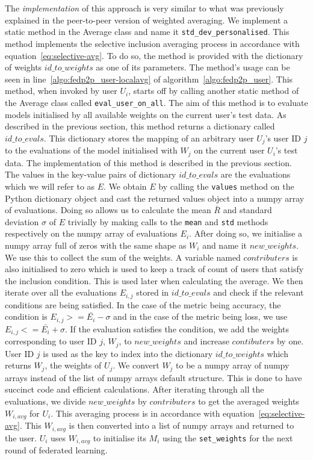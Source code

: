 \documentclass[12pt]{article}
\begin{document}
\\\\
The \textit{implementation} of this approach is very similar to what was previously explained in the peer-to-peer version of weighted averaging. We implement a static method in the Average class and name it \texttt{std\_dev\_personalised}. This method implements the selective inclusion averaging process in accordance with equation~\ref{eq:selective-avg}. To do so, the method is provided with the dictionary of weights $id\_to\_weights$ as one of its parameters. The method's usage can be seen in line~\ref{algo:fedp2p_user-localavg} of algorithm~\ref{algo:fedp2p_user}. This method, when invoked by user $U_i$, starts off by calling another static method of the Average class called \texttt{eval\_user\_on\_all}. The aim of this method is to evaluate models initialised by all available weights on the current user's test data. As described in the previous section, this method returns a dictionary called $id\_to\_evals$. This dictionary stores the mapping of an arbitrary user $U_j$'s user ID $j$ to the evaluations of the model initialised with $W_j$ on the current user $U_i$'s test data. The implementation of this method is described in the previous section. The values in the key-value pairs of dictionary $id\_to\_evals$ are the evaluations which we will refer to as $E$. We obtain $E$ by calling the \texttt{values} method on the Python dictionary object and cast the returned values object into a numpy array of evaluations. Doing so allows us to calculate the mean $\bar{R}$ and standard deviation $\sigma$ of $E$ trivially by making calls to the \texttt{mean} and \texttt{std} methods respectively on the numpy array of evaluations $E_i$. After doing so, we initialise a numpy array full of zeros with the same shape as $W_i$ and name it $new\_weights$. We use this to collect the sum of the weights. A variable named $contributers$ is also initialised to zero which is used to keep a track of count of users that satisfy the inclusion condition. This is used later when calculating the average. We then iterate over all the evaluations $E_{i,j}$ stored in $id\_to\_evals$ and check if the relevant conditions are being satisfied. In the case of the metric being accuracy, the condition is $E_{i,j} >= \bar{E_i}-\sigma$ and in the case of the metric being loss, we use $E_{i,j} <= \bar{E_i}+\sigma$. If the evaluation satisfies the condition, we add the weights corresponding to user ID $j$, $W_j$, to $new\_weights$ and increase $contibuters$ by one. User ID $j$ is used as the key to index into the dictionary $id\_to\_weights$ which returns $W_j$, the weights of $U_j$. We convert $W_j$ to be a numpy array of numpy arrays instead of the list of numpy arrays default structure. This is done to have succinct code and efficient calculations. After iterating through all the evaluations, we divide $new\_weights$ by $contributers$ to get the averaged weights $W_{i,avg}$ for $U_i$. This averaging process is in accordance with equation~\ref{eq:selective-avg}. This $W_{i,avg}$ is then converted into a list of numpy arrays and returned to the user. $U_i$ uses $W_{i,avg}$ to initialise its $M_i$ using the \texttt{set\_weights} for the next round of federated learning. 
\end{document}
